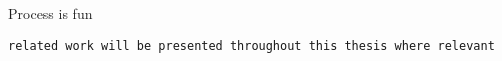 Process is fun

\begin{verbatim}
related work will be presented throughout this thesis where relevant
\end{verbatim}

